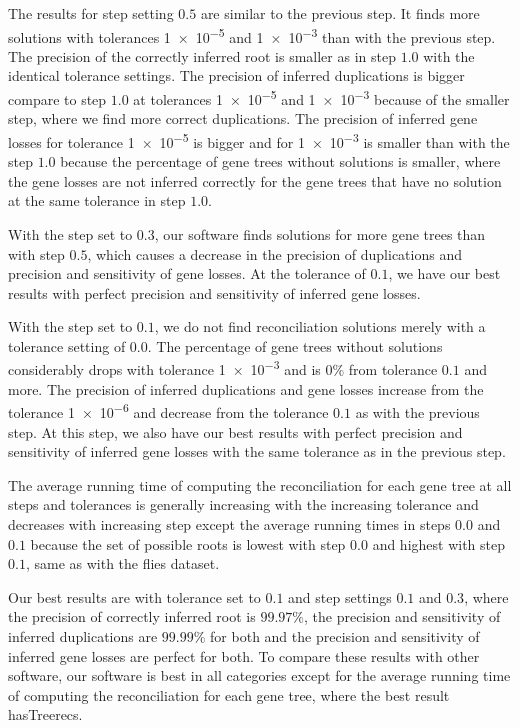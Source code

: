 The results for step setting $0.5$ are similar to the previous step. It finds more solutions with tolerances \num{1e-5} and \num{1e-3} than with the previous step. The precision of the correctly inferred root is smaller as in step $1.0$ with the identical tolerance settings. The precision of inferred duplications is bigger compare to step $1.0$ at tolerances \num{1e-5} and \num {1e-3} because of the smaller step, where we find more correct duplications. The precision of inferred gene losses for tolerance \num{1e-5} is bigger and for \num{1e-3} is smaller than with the step $1.0$ because the percentage of gene trees without solutions is smaller, where the gene losses are not inferred correctly for the gene trees that have no solution at the same tolerance in step $1.0$.

With the step set to $0.3$, our software finds solutions for more gene trees than with step $0.5$, which causes a decrease in the precision of duplications and precision and sensitivity of gene losses. At the tolerance of $0.1$, we have our best results with perfect precision and sensitivity of inferred gene losses.

With the step set to $0.1$, we do not find reconciliation solutions merely with a tolerance setting of $0.0$. The percentage of gene trees without solutions considerably drops with tolerance \num{1e-3} and is $0\%$ from tolerance $0.1$ and more. The precision of inferred duplications and gene losses increase from the tolerance \num{1e-6} and decrease from the tolerance $0.1$ as with the previous step. At this step, we also have our best results with perfect precision and sensitivity of inferred gene losses with the same tolerance as in the previous step.

The average running time of computing the reconciliation for each gene tree at all steps and tolerances is generally increasing with the increasing tolerance and decreases with increasing step except the average running times in steps $0.0$ and $0.1$ because the set of possible roots is lowest with step $0.0$ and highest with step $0.1$, same as with the flies dataset.

Our best results are with tolerance set to $0.1$ and step settings $0.1$ and $0.3$, where the precision of correctly inferred root is $99.97\%$, the precision and sensitivity of inferred duplications are $99.99\%$ for both and the precision and sensitivity of inferred gene losses are perfect for both. To compare these results with other software, our software is best in all categories except for the average running time of computing the reconciliation for each gene tree, where the best result hasTreerecs.

